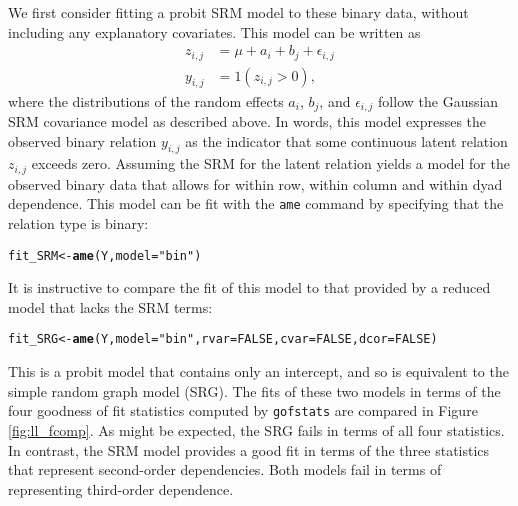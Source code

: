 \documentclass[11pt]{article}\usepackage[]{graphicx}\usepackage[]{color}
\makeatletter
\newcommand{\hlnum}[1]{\textcolor[rgb]{0.686,0.059,0.569}{#1}}%
\newcommand{\hlstr}[1]{\textcolor[rgb]{0.192,0.494,0.8}{#1}}%
\newcommand{\hlstd}[1]{\textcolor[rgb]{0.345,0.345,0.345}{#1}}%
\newcommand{\hlkwb}[1]{\textcolor[rgb]{0.69,0.353,0.396}{#1}}%
\newcommand{\hlkwc}[1]{\textcolor[rgb]{0.333,0.667,0.333}{#1}}%
\newcommand{\hlkwd}[1]{\textcolor[rgb]{0.737,0.353,0.396}{\textbf{#1}}}%
\newenvironment{kframe}{%
 \def\at@end@of@kframe{}%
 \ifinner\ifhmode%
  \def\at@end@of@kframe{\end{minipage}}%
  \begin{minipage}{\columnwidth}%
 \fi\fi%
 \def\FrameCommand##1{\hskip\@totalleftmargin \hskip-\fboxsep
 \colorbox{shadecolor}{##1}\hskip-\fboxsep
     \hskip-\linewidth \hskip-\@totalleftmargin \hskip\columnwidth}%
 \MakeFramed {\advance\hsize-\width
   \@totalleftmargin\z@ \linewidth\hsize
   \@setminipage}}%
 {\par\unskip\endMakeFramed%
 \at@end@of@kframe}
\newenvironment{knitrout}{}{} %
\makeatother
\begin{document}
We first consider fitting a probit SRM model to 
these binary data, without including any explanatory covariates. 
This model can be written as
\begin{align}
z_{i,j} & = \mu + a_i + b_j + \epsilon_{i,j}  \label{eqn:psrm} \\
y_{i,j} & = 1(z_{i,j}>0), 
\end{align}
where the distributions of the random effects $a_i$, $b_j$, 
and $\epsilon_{i,j}$ follow the Gaussian SRM covariance 
model as described above. 
In words, this model expresses
the observed binary relation $y_{i,j}$ as the indicator that some 
continuous latent relation $z_{i,j}$ exceeds zero. 
Assuming the SRM for the latent relation 
yields a model for the observed binary data that allows for 
within row, within column and within dyad dependence. 
This model can be fit with the {\tt ame} command by specifying 
that the relation type is binary:
\begin{knitrout}\footnotesize
{}\color{fgcolor}\begin{kframe}
\begin{alltt}
\hlstd{fit_SRM}\hlkwb{<-}\hlkwd{ame}\hlstd{(Y,}\hlkwc{model}\hlstd{=}\hlstr{"bin"}\hlstd{)}
\end{alltt}
\end{kframe}
\end{knitrout}
It is instructive to compare the fit of this model to that provided 
by a reduced model that lacks the SRM terms:
\begin{knitrout}\footnotesize
{}\color{fgcolor}\begin{kframe}
\begin{alltt}
\hlstd{fit_SRG}\hlkwb{<-}\hlkwd{ame}\hlstd{(Y,}\hlkwc{model}\hlstd{=}\hlstr{"bin"}\hlstd{,}\hlkwc{rvar}\hlstd{=}\hlnum{FALSE}\hlstd{,}\hlkwc{cvar}\hlstd{=}\hlnum{FALSE}\hlstd{,}\hlkwc{dcor}\hlstd{=}\hlnum{FALSE}\hlstd{)}
\end{alltt}
\end{kframe}
\end{knitrout}
This is a probit model that contains only an intercept, 
and so is equivalent to the simple random graph model (SRG). 
The fits of these two models in terms of the four 
goodness of fit statistics computed by 
{\tt gofstats} are compared in 
Figure 
\ref{fig:ll_fcomp}. 
As might be expected, the SRG fails in terms of all four statistics. 
In contrast, the SRM model provides a good fit in terms 
of the three statistics that represent second-order dependencies. 
Both models fail in terms of representing third-order 
dependence. 
\end{document}
